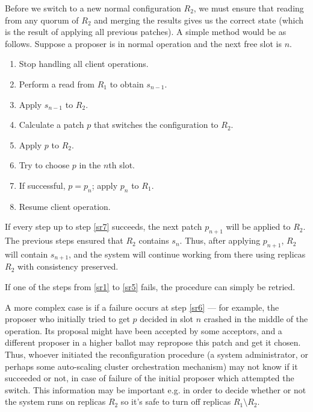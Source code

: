 \documentclass[12pt,a4paper,en]{pracamgr}
\begin{document}
Before we switch to a new normal configuration $R_2$, we must ensure that reading from any quorum of $R_2$ and merging the results gives us the correct state (which is the result of applying all previous patches). A simple method would be as follows. Suppose a proposer is in normal operation and the next free slot is $n$.
\begin{enumerate}
    \item \label{sr1} Stop handling all client operations.
    \item \label{sr2} Perform a read from $R_1$ to obtain $s_{n-1}$.
    \item \label{sr3} Apply $s_{n-1}$ to $R_2$.
    \item \label{sr4} Calculate a patch $p$ that switches the configuration to $R_2$.
    \item \label{sr5} Apply $p$ to $R_2$.
    \item \label{sr6} Try to choose $p$ in the $n$th slot.
    \item \label{sr7} If successful, $p = p_n$; apply $p_n$ to $R_1$.
    \item \label{sr8} Resume client operation.
\end{enumerate}
If every step up to step \ref{sr7} succeeds, the next patch $p_{n+1}$ will be applied to $R_2$. The previous steps ensured that $R_2$ contains $s_n$. Thus, after applying $p_{n+1}$, $R_2$ will contain $s_{n+1}$, and the system will continue working from there using replicas $R_2$ with consistency preserved.

If one of the steps from \ref{sr1} to \ref{sr5} fails, the procedure can simply be retried.

A more complex case is if a failure occurs at step \ref{sr6} --- for example, the proposer who initially tried to get $p$ decided in slot $n$ crashed in the middle of the operation. Its proposal might have been accepted by some acceptors, and a different proposer in a higher ballot may repropose this patch and get it chosen. Thus, whoever initiated the reconfiguration procedure (a system administrator, or perhaps some auto-scaling cluster orchestration mechanism) may not know if it succeeded or not, in case of failure of the initial proposer which attempted the switch. This information may be important e.g. in order to decide whether or not the system runs on replicas $R_2$ so it's safe to turn off replicas $R_1 \setminus R_2$.
\end{document}
